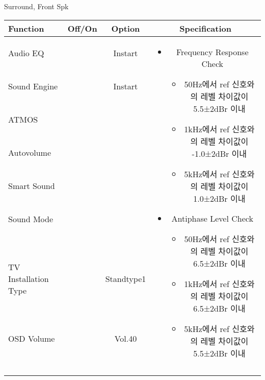 \begin{frame}[t]{Surround, Front Spk}
\begin{tiny}
\begin{tabular}{@{}lccc@{}}
\toprule
Function & Off/On & Option & Specification \\
\midrule
Audio EQ & \color{black}{Off} & Instart &
\multirow{10}{60mm}{
\begin{itemize}
	\vspace{-3mm}
	\item Frequency Response Check
	\begin{itemize}
		\item 50Hz에서 ref 신호와의 레벨 차이값이 5.5±2dBr 이내
		\item 1kHz에서 ref 신호와의 레벨 차이값이 -1.0±2dBr 이내
		\item 5kHz에서 ref 신호와의 레벨 차이값이 1.0±2dBr 이내
	\end{itemize}
	\item Antiphase Level Check
	\begin{itemize}
		\item 50Hz에서 ref 신호와의 레벨 차이값이 6.5±2dBr 이내
		\item 1kHz에서 ref 신호와의 레벨 차이값이 6.5±2dBr 이내
		\item 5kHz에서 ref 신호와의 레벨 차이값이 5.5±2dBr 이내
	\end{itemize}
\end{itemize}
} \\
Sound Engine & \color{blue}{On} & Instart & \\
ATMOS & \color{black}{Off}  & & \\
Autovolume & \color{black}{Off} & & \\
Smart Sound & \color{black}{Off} & & \\
Sound Mode & \color{blue}{On} & \color{blue}{Surround} & \\
TV Installation Type & \color{blue}{On} & Standtype1 & \\
OSD Volume & \color{blue}{On} & Vol.40 & \\
& & & \\
& & & \\
& & & \\
& & & \\
\midrule
\end{tabular}
\end{tiny}


\end{frame}

